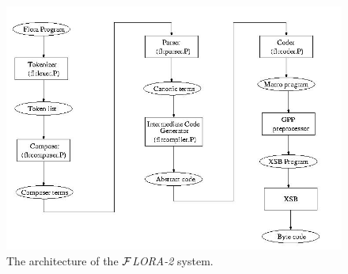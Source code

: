 \documentclass[11pt]{article}
\newcommand{\FLORA}{{\mbox{${\cal F}${\small\it LORA}\rm\emph{-2}}}\xspace}
\begin{document}
\begin{figure}[bt]
  \begin{center}
    \includegraphics[width=5.5in]{architecture}
  \end{center}
  \caption{The architecture of the \FLORA system.}
  \label{fig-arch}
\end{figure}
\end{document}
